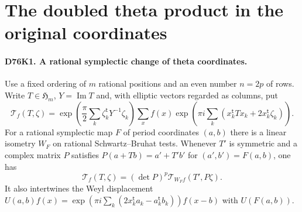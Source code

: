 \section{The doubled theta product in the original coordinates}

\paragraph{D76K1. A rational symplectic change of theta coordinates.}
Use a fixed ordering of $m$ rational positions and an even number
$n=2p$ of rows. Write $T\in\mathfrak H_m$, $Y=\operatorname{Im}T$
and, with elliptic vectors regarded as columns, put
\[
 \mathcal T_f(T,\zeta)=
 \exp\!\left(\frac\pi2\sum_k\zeta_k^{\mathsf t}Y^{-1}\zeta_k\right)
 \sum_x f(x)\exp\!\left(\pi i\sum_k
 (x_k^{\mathsf t}Tx_k+2x_k^{\mathsf t}\zeta_k)\right).
\]
For a rational symplectic map $F$ of period coordinates $(a,b)$
there is a linear isometry $W_F$ on rational Schwartz--Bruhat
tests. Whenever $T'$ is symmetric and a complex matrix $P$ satisfies
$P(a+Tb)=a'+T'b'$ for $(a',b')=F(a,b)$, one has
\[
       \mathcal T_f(T,\zeta)=
       (\det P)^p\mathcal T_{W_Ff}(T',P\zeta).
\]
It also intertwines the Weyl displacement
$U(a,b)f(x)=\exp(\pi i\sum_k(2x_k^{\mathsf t}a_k-a_k^{\mathsf t}b_k))
 f(x-b)$ with $U(F(a,b))$.

